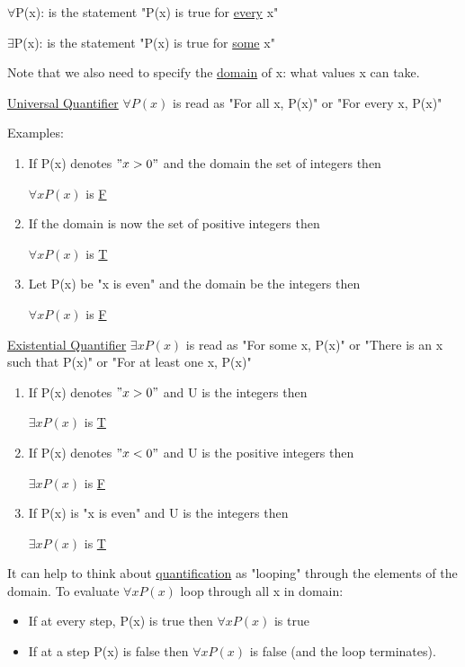 \documentclass{article}
\begin{document}
$\forall$P(x): is the statement "P(x) is true for \underline{every} x"

$\exists$P(x): is the statement "P(x) is true for \underline{some} x"

\hfill \break
Note that we also need to specify the \underline{domain} of x: what values x can take.

\hfill \break
\underline{Universal Quantifier}
$\forall P(x)$ is read as "For all x, P(x)" or "For every x, P(x)"

\hfill \break
Examples:
\begin{enumerate}
    \item If P(x) denotes $"x>0"$ and the domain the set of integers then
    \begin{center}
    $\forall x P(x)$ is \underline{F}
    \end{center}
    \item If the domain is now the set of positive integers then
    \begin{center}
        $\forall x P(x)$ is \underline{T}
    \end{center}
    \item Let P(x) be "x is even" and the domain be the integers then
    \begin{center}
        $\forall x P(x)$ is \underline{F}
    \end{center}
\end{enumerate}

\hfill \break
\underline{Existential Quantifier}
\hfill \break
$\exists x P(x)$ is read as "For some x, P(x)" or "There is an x such that P(x)" or "For at least one x, P(x)"
\begin{enumerate}
    \item If P(x) denotes $"x>0"$ and U is the integers then
    \begin{center}
        $\exists xP(x)$ is \underline{T}
    \end{center}
    \item If P(x) denotes $"x<0"$ and U is the positive integers then
    \begin{center}
        $\exists xP(x)$ is \underline{F}
    \end{center}
    \item If P(x) is "x is even" and U is the integers then
    \begin{center}
        $\exists xP(x)$ is \underline{T}
    \end{center}
\end{enumerate}
\hfill \break
It can help to think about \underline{quantification} as "looping" through the elements of the domain.
\hfill \break
To evaluate $\forall xP(x)$ loop through all x in domain:
\begin{itemize}
    \item If at every step, P(x) is true then $\forall xP(x)$ is true
    \item If at a step P(x) is false then $\forall xP(x)$ is false (and the loop terminates).
\end{itemize}
\end{document}
